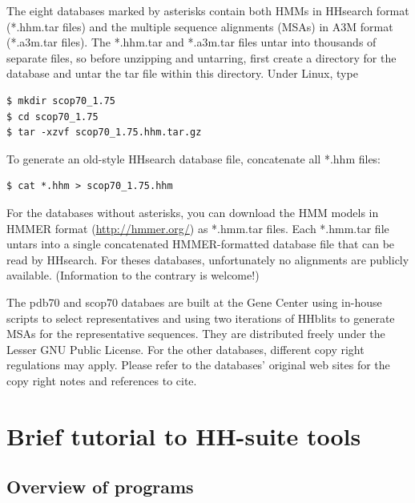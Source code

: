 \documentclass[11pt,a4paper]{article}
\begin{document}
The eight databases marked by asterisks contain both HMMs in HHsearch 
format (*.hhm.tar files) and the multiple sequence alignments (MSAs) in 
A3M format (*.a3m.tar files).  The *.hhm.tar and *.a3m.tar files untar into thousands
of separate files, so before unzipping and untarring, first create a directory for 
the database and untar the tar file within this directory. Under Linux, type
\begin{verbatim}
$ mkdir scop70_1.75
$ cd scop70_1.75
$ tar -xzvf scop70_1.75.hhm.tar.gz
\end{verbatim}

To generate an old-style HHsearch database file, concatenate all *.hhm files:
\begin{verbatim}
$ cat *.hhm > scop70_1.75.hhm
\end{verbatim}
For the databases without asterisks, you can download the HMM models in HMMER format (\url{http://hmmer.org/})
as *.hmm.tar files. Each *.hmm.tar file untars into a single concatenated HMMER-formatted 
database file that can be read by HHsearch. For theses databases, unfortunately no 
alignments are publicly available. (Information to the contrary is welcome!) 

The pdb70 and scop70 databaes are built at the Gene Center using in-house scripts 
to select representatives and using two iterations of HHblits to generate MSAs for the 
representative sequences. They are distributed freely under the Lesser GNU Public License. 
For the other databases, different copy right regulations may apply. 
Please refer to the databases' original web sites for the copy right notes and 
references to cite.


\section{Brief tutorial to HH-suite tools}

\subsection{Overview of programs}
\end{document}
